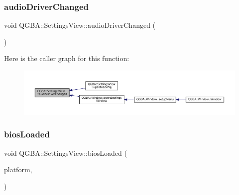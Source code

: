 \subsubsection{\texorpdfstring{audio\+Driver\+Changed}{audioDriverChanged}}
{\footnotesize\ttfamily void Q\+G\+B\+A\+::\+Settings\+View\+::audio\+Driver\+Changed (\begin{DoxyParamCaption}{ }\end{DoxyParamCaption})\hspace{0.3cm}{\ttfamily [signal]}}

Here is the caller graph for this function\+:
\nopagebreak
\begin{figure}[H]
\begin{center}
\leavevmode
\includegraphics[width=350pt]{class_q_g_b_a_1_1_settings_view_af17733fea12d5dba72604c1a837cb7e9_icgraph}
\end{center}
\end{figure}
\mbox{\label{class_q_g_b_a_1_1_settings_view_a970e1868f2c564fd80b5bc4b9364b208}} 
\subsubsection{\texorpdfstring{bios\+Loaded}{biosLoaded}}
{\footnotesize\ttfamily void Q\+G\+B\+A\+::\+Settings\+View\+::bios\+Loaded (\begin{DoxyParamCaption}\item[{\mbox{\hyperlink{ioapi_8h_a787fa3cf048117ba7123753c1e74fcd6}{int}}}]{platform,  }\item[{const Q\+String \&}]{ }\end{DoxyParamCaption})\hspace{0.3cm}{\ttfamily [signal]}}

